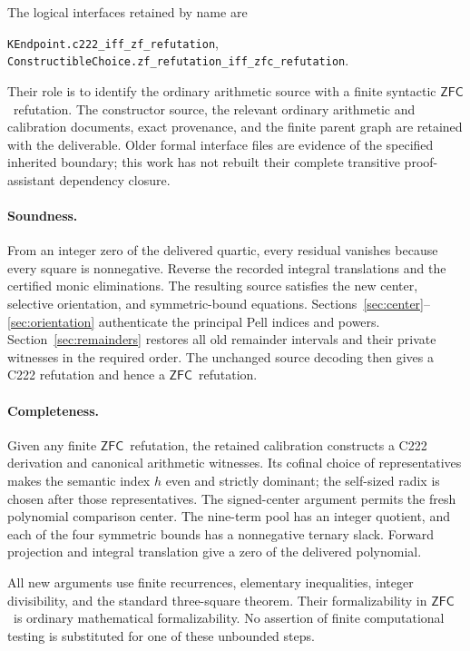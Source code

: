 \documentclass[11pt,letterpaper]{article}
\theoremstyle{definition}\newtheorem{definition}[theorem]{Definition}
\theoremstyle{remark}\newtheorem{remark}[theorem]{Remark}
\newcommand{\ZFC}{\ensuremath{\mathsf{ZFC}}}
\begin{document}
The logical interfaces retained by name are
\begin{center}\small
\texttt{KEndpoint.c222\_iff\_zf\_refutation},\qquad
\texttt{ConstructibleChoice.zf\_refutation\_iff\_zfc\_refutation}.
\end{center}
Their role is to identify the ordinary arithmetic source with a finite syntactic \ZFC\ refutation. The constructor source, the relevant ordinary arithmetic and calibration documents, exact provenance, and the finite parent graph are retained with the deliverable. Older formal interface files are evidence of the specified inherited boundary; this work has not rebuilt their complete transitive proof-assistant dependency closure.

\paragraph{Soundness.}
From an integer zero of the delivered quartic, every residual vanishes because every square is nonnegative. Reverse the recorded integral translations and the certified monic eliminations. The resulting source satisfies the new center, selective orientation, and symmetric-bound equations. Sections~\ref{sec:center}--\ref{sec:orientation} authenticate the principal Pell indices and powers. Section~\ref{sec:remainders} restores all old remainder intervals and their private witnesses in the required order. The unchanged source decoding then gives a C222 refutation and hence a \ZFC\ refutation.

\paragraph{Completeness.}
Given any finite \ZFC\ refutation, the retained calibration constructs a C222 derivation and canonical arithmetic witnesses. Its cofinal choice of representatives makes the semantic index \(h\) even and strictly dominant; the self-sized radix is chosen after those representatives. The signed-center argument permits the fresh polynomial comparison center. The nine-term pool has an integer quotient, and each of the four symmetric bounds has a nonnegative ternary slack. Forward projection and integral translation give a zero of the delivered polynomial.

All new arguments use finite recurrences, elementary inequalities, integer divisibility, and the standard three-square theorem. Their formalizability in \ZFC\ is ordinary mathematical formalizability. No assertion of finite computational testing is substituted for one of these unbounded steps.
\end{document}
